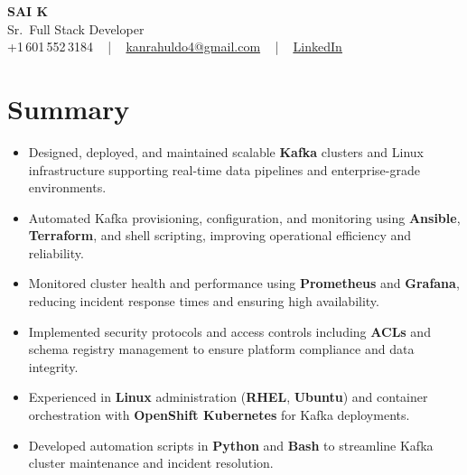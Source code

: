 \documentclass[letterpaper,11pt]{article}
\newcommand{\resumeItem}[1]{
  \item\footnotesize{
    {#1 \vspace{-2pt}}
  }
}
\newcommand{\resumeItemListStart}{\begin{itemize}[leftmargin=*]}
\newcommand{\resumeItemListEnd}{\end{itemize}\vspace{-5pt}}
\begin{document}
\begin{center}
    {\fontsize{14pt}{12pt}\selectfont \textbf{\MakeUppercase{Sai K}}}\\ \vspace{2pt}
    \fontsize{10pt}{12pt}\selectfont Sr.\ Full Stack Developer\\ \vspace{2pt}
    \fontsize{10pt}{12pt}\selectfont +1\,601\,552\,3184 ~ | ~
    \href{mailto:kanrahuldo4@gmail.com}{kanrahuldo4@gmail.com} ~ | ~
    \href{https://www.linkedin.com/in/srrrk/}{\color{blue}\underline{LinkedIn}}
    \vspace{-10pt}
\end{center}

\section{Summary}
\fontsize{9pt}{10pt}\selectfont
\resumeItemListStart
  \resumeItem{Designed, deployed, and maintained scalable \textbf{Kafka} clusters and Linux infrastructure supporting real-time data pipelines and enterprise-grade environments.}
  \resumeItem{Automated Kafka provisioning, configuration, and monitoring using \textbf{Ansible}, \textbf{Terraform}, and shell scripting, improving operational efficiency and reliability.}
  \resumeItem{Monitored cluster health and performance using \textbf{Prometheus} and \textbf{Grafana}, reducing incident response times and ensuring high availability.}
  \resumeItem{Implemented security protocols and access controls including \textbf{ACLs} and schema registry management to ensure platform compliance and data integrity.}
  \resumeItem{Experienced in \textbf{Linux} administration (\textbf{RHEL}, \textbf{Ubuntu}) and container orchestration with \textbf{OpenShift Kubernetes} for Kafka deployments.}
  \resumeItem{Developed automation scripts in \textbf{Python} and \textbf{Bash} to streamline Kafka cluster maintenance and incident resolution.}
\resumeItemListEnd
\vspace{-6pt}

\end{document}
